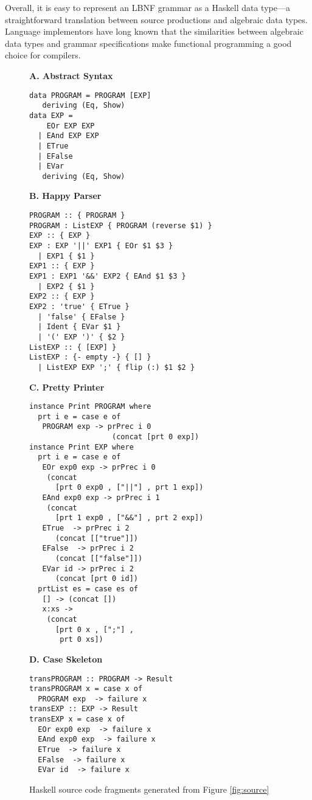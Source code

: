 Overall, it is easy to represent an LBNF grammar as a Haskell data
type---a straightforward translation between source productions and algebraic data types. Language implementors have long known that the similarities between algebraic data types and grammar specifications make functional programming a good choice for compilers.
\begin{figure}
\begin{boxedminipage}[t]{\textwidth}
\begin{minipage}[l]{0.5\textwidth}

\textbf{A. Abstract Syntax}
\scriptsize
\begin{verbatim}
data PROGRAM = PROGRAM [EXP]
   deriving (Eq, Show)
data EXP =
    EOr EXP EXP
  | EAnd EXP EXP
  | ETrue
  | EFalse
  | EVar
   deriving (Eq, Show)
\end{verbatim}
\normalsize
\textbf{B. Happy Parser}

\scriptsize
\begin{verbatim}
PROGRAM :: { PROGRAM }
PROGRAM : ListEXP { PROGRAM (reverse $1) } 
EXP :: { EXP }
EXP : EXP '||' EXP1 { EOr $1 $3 } 
  | EXP1 { $1 }
EXP1 :: { EXP }
EXP1 : EXP1 '&&' EXP2 { EAnd $1 $3 } 
  | EXP2 { $1 }
EXP2 :: { EXP }
EXP2 : 'true' { ETrue } 
  | 'false' { EFalse }
  | Ident { EVar $1 }
  | '(' EXP ')' { $2 }
ListEXP :: { [EXP] }
ListEXP : {- empty -} { [] } 
  | ListEXP EXP ';' { flip (:) $1 $2 }
\end{verbatim}
\normalsize
\end{minipage}
\hfill
\begin{minipage}[r]{0.5\textwidth}

\textbf{C. Pretty Printer}

\scriptsize
\begin{verbatim}
instance Print PROGRAM where
  prt i e = case e of
   PROGRAM exp -> prPrec i 0 
                   (concat [prt 0 exp])
instance Print EXP where
  prt i e = case e of
   EOr exp0 exp -> prPrec i 0 
    (concat 
      [prt 0 exp0 , ["||"] , prt 1 exp])
   EAnd exp0 exp -> prPrec i 1 
    (concat 
      [prt 1 exp0 , ["&&"] , prt 2 exp])
   ETrue  -> prPrec i 2 
      (concat [["true"]])
   EFalse  -> prPrec i 2 
      (concat [["false"]])
   EVar id -> prPrec i 2 
      (concat [prt 0 id])
  prtList es = case es of
   [] -> (concat [])
   x:xs -> 
    (concat 
      [prt 0 x , [";"] , 
       prt 0 xs])
\end{verbatim}
\normalsize

\textbf{D. Case Skeleton}

\scriptsize
\begin{verbatim}
transPROGRAM :: PROGRAM -> Result
transPROGRAM x = case x of
  PROGRAM exp  -> failure x
transEXP :: EXP -> Result
transEXP x = case x of
  EOr exp0 exp  -> failure x
  EAnd exp0 exp  -> failure x
  ETrue  -> failure x
  EFalse  -> failure x
  EVar id  -> failure x
\end{verbatim}
\hfill
\end{minipage}
\end{boxedminipage}
\caption{Haskell source code fragments generated from Figure \ref{fig:source}}
\label{fig:haskell}
\end{figure}

